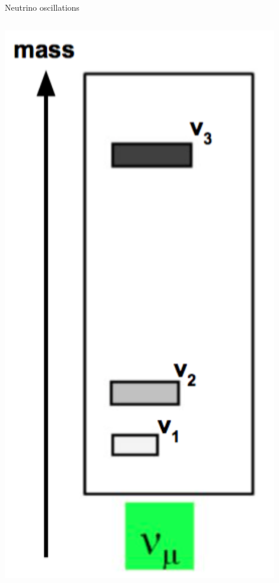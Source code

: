 %
%
%

\begin{frame}{Neutrino oscillations}

\begin{columns}
 \begin{column}{0.30\textwidth}
   \begin{center}
   \includegraphics[width=0.90\textwidth]{./images/osc101/mass_spectrum_numu_02}\\

\end{center}
\end{column}
\end{columns}
\end{frame}
